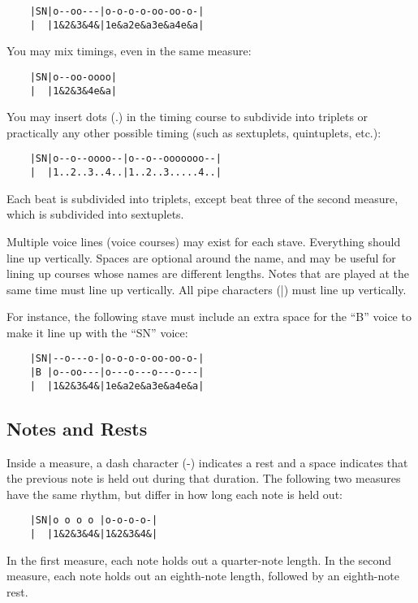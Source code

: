 \documentclass{article}
\begin{document}
\begin{verbatim}
    |SN|o--oo---|o-o-o-o-oo-oo-o-|
    |  |1&2&3&4&|1e&a2e&a3e&a4e&a|
\end{verbatim}

You may mix timings, even in the same measure:

\begin{verbatim}
    |SN|o--oo-oooo|
    |  |1&2&3&4e&a|
\end{verbatim}

You may insert dots (.) in the timing course to subdivide into triplets or
practically any other possible timing (such as sextuplets, quintuplets, etc.):

\begin{verbatim}
    |SN|o--o--oooo--|o--o--ooooooo--|
    |  |1..2..3..4..|1..2..3.....4..|
\end{verbatim}

Each beat is subdivided into triplets, except beat three of the second measure,
which is subdivided into sextuplets.

Multiple voice lines (voice courses) may exist for each stave.  Everything
should line up vertically.  Spaces are optional around the name, and may be
useful for lining up courses whose names are different lengths.  Notes that are
played at the same time must line up vertically.  All pipe characters (|) must
line up vertically.

For instance, the following stave must include an extra space for the ``B''
voice to make it line up with the ``SN'' voice:

\begin{verbatim}
    |SN|--o---o-|o-o-o-o-oo-oo-o-|
    |B |o--oo---|o---o---o---o---|
    |  |1&2&3&4&|1e&a2e&a3e&a4e&a|
\end{verbatim}

\subsection*{Notes and Rests}

Inside a measure, a dash character (-) indicates a rest and a space indicates
that the previous note is held out during that duration.  The following two
measures have the same rhythm, but differ in how long each note is held out:

\begin{verbatim}
    |SN|o o o o |o-o-o-o-|
    |  |1&2&3&4&|1&2&3&4&|
\end{verbatim}

In the first measure, each note holds out a quarter-note length.  In the second
measure, each note holds out an eighth-note length, followed by an eighth-note
rest.
\end{document}
